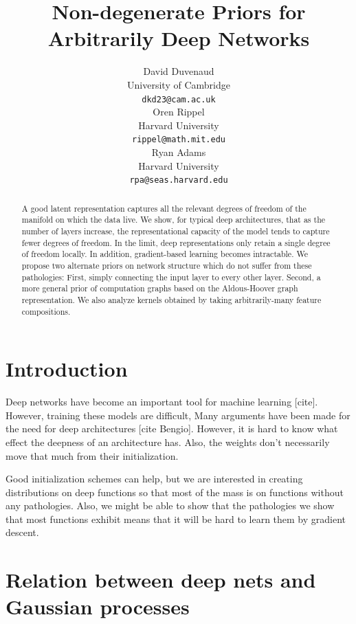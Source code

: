 \documentclass{article}
\title{Non-degenerate Priors for Arbitrarily Deep Networks}
\author{
David Duvenaud \\
University of Cambridge \\
\texttt{dkd23@cam.ac.uk} \\
\And
Oren Rippel \\
Harvard University \\
\texttt{rippel@math.mit.edu} \\
\And
Ryan Adams \\
Harvard University \\
\texttt{rpa@seas.harvard.edu} \\
}
\begin{document}
\maketitle

\begin{abstract}
A good latent representation captures all the relevant degrees of freedom of the manifold on which the data live.  We show, for typical deep architectures, that as the number of layers increase, the representational capacity of the model tends to capture fewer degrees of freedom.  In the limit, deep representations only retain a single degree of freedom locally.  In addition, gradient-based learning becomes intractable.  We propose two alternate priors on network structure which do not suffer from these pathologies:  First, simply connecting the input layer to every other layer.  Second, a more general prior of computation graphs based on the Aldous-Hoover graph representation.  We also analyze kernels obtained by taking arbitrarily-many feature compositions.
\end{abstract}

\section{Introduction}

Deep networks have become an important tool for machine learning [cite].  However, training these models are difficult, Many arguments have been made for the need for deep architectures [cite Bengio].  However, it is hard to know what effect the deepness of an architecture has.  Also, the weights don't necessarily move that much from their initialization.

Good initialization schemes can help, but we are interested in creating distributions on deep functions so that most of the mass is on functions without any pathologies.  Also, we might be able to show that the pathologies we show that most functions exhibit means that it will be hard to learn them by gradient descent.

\section{Relation between deep nets and Gaussian processes}
\end{document}
